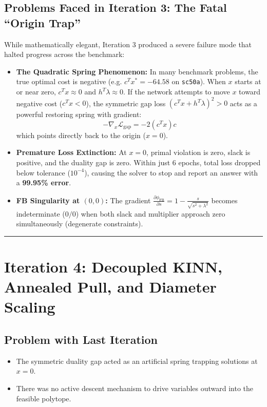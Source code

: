 \documentclass[11pt,a4paper]{article}
\begin{document}
\subsection{Problems Faced in Iteration 3: The Fatal ``Origin Trap''}
While mathematically elegant, Iteration 3 produced a severe failure mode that halted progress across the benchmark:
\begin{itemize}[leftmargin=1.5em, itemsep=3pt]
    \item \textbf{The Quadratic Spring Phenomenon:} In many benchmark problems, the true optimal cost is negative (e.g. $c^T x^* = -64.58$ on \texttt{sc50a}). When $x$ starts at or near zero, $c^T x \approx 0$ and $h^T \lambda \approx 0$. If the network attempts to move $x$ toward negative cost ($c^T x < 0$), the symmetric gap loss $(c^T x + h^T \lambda)^2 > 0$ acts as a powerful restoring spring with gradient:
    \begin{equation}
        -\nabla_x \mathcal{L}_{\text{gap}} = -2(c^T x) c
    \end{equation}
    which points directly back to the origin ($x = 0$).
    \item \textbf{Premature Loss Extinction:} At $x = 0$, primal violation is zero, slack is positive, and the duality gap is zero. Within just 6 epochs, total loss dropped below tolerance ($10^{-4}$), causing the solver to stop and report an answer with a \textbf{99.95\% error}.
    \item \textbf{FB Singularity at $(0, 0)$:} The gradient $\frac{\partial \phi_{\text{FB}}}{\partial s} = 1 - \frac{s}{\sqrt{s^2 + \lambda^2}}$ becomes indeterminate ($0/0$) when both slack and multiplier approach zero simultaneously (degenerate constraints).
\end{itemize}

\vspace{1em}
\hrule
\vspace{1.5em}

\section{Iteration 4: Decoupled KINN, Annealed Pull, and Diameter Scaling}

\subsection{Problem with Last Iteration}
\begin{itemize}[leftmargin=1.5em, itemsep=2pt]
    \item The symmetric duality gap acted as an artificial spring trapping solutions at $x = 0$.
    \item There was no active descent mechanism to drive variables outward into the feasible polytope.
\end{itemize}
\end{document}
